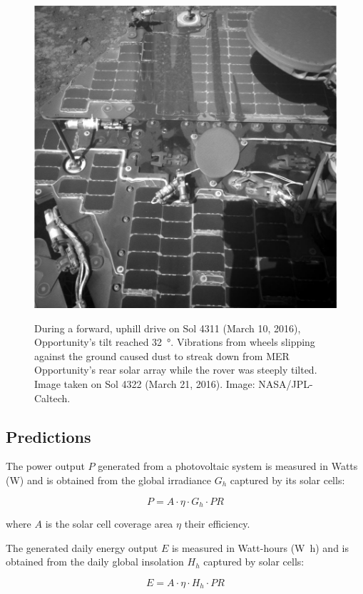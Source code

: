 \begin{figure}[h]
  \centering
  \hypersetup{linkcolor=captionTextColor}
  \includegraphics[width=0.4\linewidth]{sections/mars-solar-energy/photovoltaic-energy/images/mer-opportunity-dust-streaks.png}\\
  \caption[Streak of dust on \ac{MER} Opportunity's rear solar array during a steep tilt]
          {During a forward, uphill drive on Sol 4311 (March 10, 2016), Opportunity's tilt reached \SI{32}{\degree}. Vibrations from wheels slipping against the ground caused dust to streak down from \ac{MER} Opportunity's rear solar array while the rover was steeply tilted. Image taken on Sol 4322 (March 21, 2016). Image: \ac{NASA}/\ac{JPL}-Caltech.}
  \label{fig:image:mer-opportunity-dust-streaks}
\end{figure}

\subsection{Predictions}
\label{sec:PowerAndEnergyPredictions:Predictions}

The power output $P$ generated from a photovoltaic system is measured in Watts (\si{\watt}) and is obtained from the global irradiance $G_{h}$ captured by its solar cells:

\begin{equation}
  \label{eq:SA_power}
  P = A \cdot \eta \cdot G_{h} \cdot PR
\end{equation}

where $A$ is the solar cell coverage area $\eta$ their efficiency.

The generated daily energy output $E$ is measured in Watt-hours (\si{\watt\hour}) and is obtained from the daily global insolation $H_{h}$ captured by solar cells:

\begin{equation}
  \label{eq:SA_energy}
  E = A \cdot \eta \cdot H_{h} \cdot PR
\end{equation}

